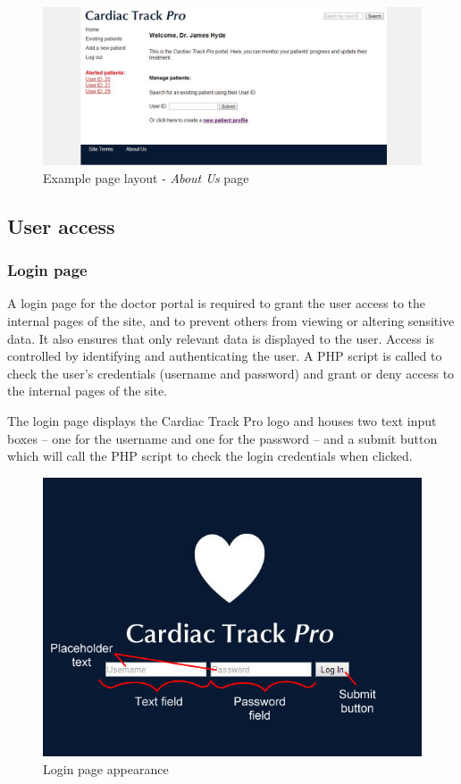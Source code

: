 \documentclass[11pt]{article}
\begin{document}
\begin{figure}[ht]
\begin{center}
\includegraphics[scale=0.5]{siteDesignGeneral}
\caption{Example page layout - \textit{About Us} page}
\label{fig:siteDesignGeneral}
\end{center}
\end{figure}

\subsection{User access}

\subsubsection{Login page}
A login page for the doctor portal is required to grant the user access to the internal pages of the site, and to prevent others from viewing or altering sensitive data. It also ensures that only relevant data is displayed to the user. Access is controlled by identifying and authenticating the user. A PHP script is called to check the user’s credentials (username and password) and grant or deny access to the internal pages of the site.

The login page displays the Cardiac Track Pro logo and houses two text input boxes – one for the username and one for the password – and a submit button which will call the PHP script to check the login credentials when clicked.

\begin{figure}[ht]
\begin{center}
\includegraphics[scale=0.6]{login_design}
\end{center}
\caption{Login page appearance}
\label{fig:login_design}
\end{figure}
\end{document}
